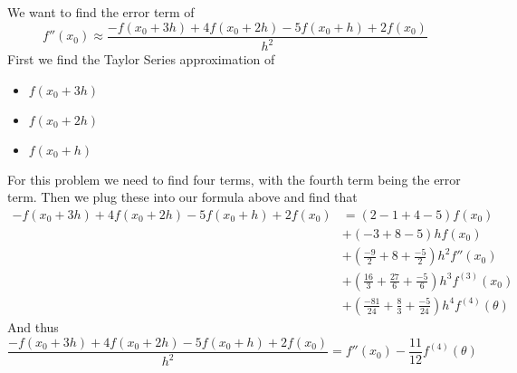 \documentclass{article}
\begin{document}
\section{}
We want to find the error term of
\[f''(x_0) \approx \frac{-f(x_0+3h)+4f(x_0+2h)-5f(x_0+h)+2f(x_0)}{h^2}\]
First we find the Taylor Series approximation of 
\begin{itemize}
\item \(f(x_0+3h)\)
\item \(f(x_0+2h)\)
\item \(f(x_0+h)\)
\end{itemize}
For this problem we need to find four terms, with the fourth term
being the error term.  Then we plug these into our formula above and
find that
\begin{align*}
    -f(x_0+3h)+4f(x_0+2h)-5f(x_0+h)+2f(x_0)  &= (2-1+4-5)f(x_0) \\
    &+ (-3+8-5)hf(x_0) \\
    &+ (\frac{-9}{2}+8+\frac{-5}{2})h^2f''(x_0)\\
    &+ (\frac{16}{3}+\frac{27}{6}+\frac{-5}{6})h^3f^{(3)}(x_0)\\
    &+ (\frac{-81}{24}+\frac{8}{3}+\frac{-5}{24})h^4f^{(4)}(\theta)
\end{align*}
And thus
\[\frac{-f(x_0+3h)+4f(x_0+2h)-5f(x_0+h)+2f(x_0)}{h^2} = f''(x_0) - \frac{11}{12}f^{(4)}(\theta)\]


\end{document}
